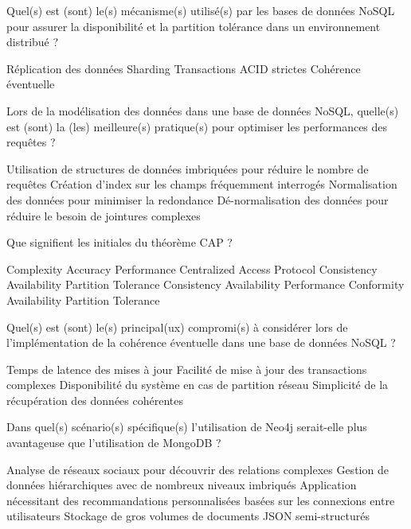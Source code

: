 \documentclass[12pt,a4paper,addpoints,answers]{exam}
\begin{document}
\begin{questions}
		\question[1\half] Quel(s) est (sont) le(s) mécanisme(s) utilisé(s) par les bases de données NoSQL pour assurer la disponibilité et la partition tolérance dans un environnement distribué ?
		\begin{checkboxes}
			\CorrectChoice Réplication des données
			\CorrectChoice Sharding
			\choice Transactions ACID strictes
			\CorrectChoice Cohérence éventuelle
		\end{checkboxes}
		
		\question[1\half] Lors de la modélisation des données dans une base de données NoSQL, quelle(s) est (sont) la (les) meilleure(s) pratique(s) pour optimiser les performances des requêtes ?
		\begin{checkboxes}
			\CorrectChoice Utilisation de structures de données imbriquées pour réduire le nombre de requêtes
			\CorrectChoice Création d'index sur les champs fréquemment interrogés
			\choice Normalisation des données pour minimiser la redondance
			\CorrectChoice Dé-normalisation des données pour réduire le besoin de jointures complexes
		\end{checkboxes}
		
		\question[1] Que signifient les initiales du théorème CAP ?
		\begin{checkboxes}
			\choice Complexity Accuracy Performance
			\choice Centralized Access Protocol
			\CorrectChoice Consistency Availability Partition Tolerance
			\choice Consistency Availability Performance
			\choice Conformity Availability Partition Tolerance
		\end{checkboxes}
		
		\question[1] Quel(s) est (sont) le(s) principal(ux) compromi(s) à considérer lors de l'implémentation de la cohérence éventuelle dans une base de données NoSQL ?
		\begin{checkboxes}
			\CorrectChoice Temps de latence des mises à jour
			\choice Facilité de mise à jour des transactions complexes
			\CorrectChoice Disponibilité du système en cas de partition réseau
			\choice Simplicité de la récupération des données cohérentes
		\end{checkboxes}
		
		\question[1] Dans quel(s) scénario(s) spécifique(s) l'utilisation de Neo4j serait-elle plus avantageuse que l'utilisation de MongoDB ?
		\begin{checkboxes}
			\CorrectChoice Analyse de réseaux sociaux pour découvrir des relations complexes
			\choice Gestion de données hiérarchiques avec de nombreux niveaux imbriqués
			\CorrectChoice Application nécessitant des recommandations personnalisées basées sur les connexions entre utilisateurs
			\choice Stockage de gros volumes de documents JSON semi-structurés
		\end{checkboxes}
		

\end{questions}
\end{document}
